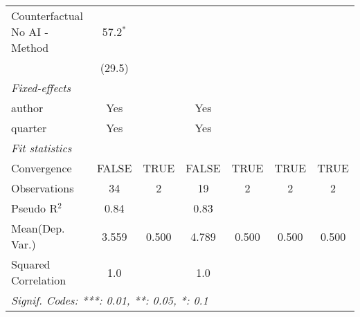 \begin{tabular}{lcccccc}
   Counterfactual No AI - Method & 57.2$^{*}$   &      &            &      &      &   \\   
                                 & (29.5)       &      &            &      &      &   \\   
   \midrule
   \emph{Fixed-effects}\\
   author                        & Yes          &      & Yes        &      &      & \\  
   quarter                       & Yes          &      & Yes        &      &      & \\  
   \midrule
   \emph{Fit statistics}\\
   Convergence                   &FALSE         & TRUE & FALSE      & TRUE & TRUE & TRUE\\  
   Observations                  & 34           & 2    & 19         & 2    & 2    & 2\\  
   Pseudo R$^2$                  & 0.84         &      & 0.83       &      &      & \\  
Mean(Dep. Var.) & 3.559 & 0.500 & 4.789 & 0.500 & 0.500 & 0.500 \\
   Squared Correlation           & 1.0          &      & 1.0        &      &      & \\  
   \midrule \midrule
   \multicolumn{7}{l}{\emph{Signif. Codes: ***: 0.01, **: 0.05, *: 0.1}}\\
\end{tabular}
\par\endgroup
